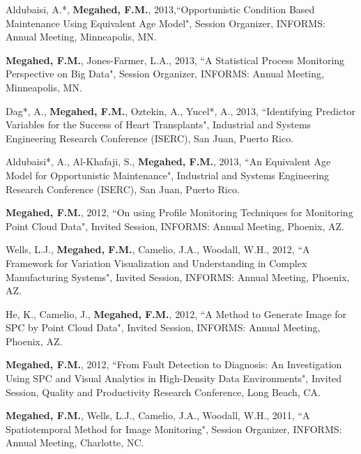 \documentclass[margin,line]{res}
\begin{document}
\begin{resume}
\vspace{-1.5mm}
Aldubaisi, A.*, \textbf{Megahed, F.M.}, 2013,``Opportunistic Condition Based Maintenance Using Equivalent Age Model", Session Organizer, INFORMS: Annual Meeting, Minneapolis, MN.

\vspace{-1.5mm}
\textbf{Megahed, F.M.}, Jones-Farmer, L.A., 2013, ``A Statistical Process Monitoring Perspective on Big Data", Session Organizer, INFORMS: Annual Meeting, Minneapolis, MN.

\vspace{-1.5mm}
Dag*, A., \textbf{Megahed, F.M.}, Oztekin, A., Yucel*, A., 2013, ``Identifying Predictor Variables for the Success of Heart Transplants", Industrial and Systems Engineering Research Conference (ISERC), San Juan, Puerto Rico.

\vspace{-1.5mm}
Aldubaisi*, A., Al-Khafaji, S., \textbf{Megahed, F.M.}, 2013, ``An Equivalent Age Model for Opportunistic Maintenance", Industrial and Systems Engineering Research Conference (ISERC), San Juan, Puerto Rico.

\vspace{-1.5mm}
\textbf{Megahed, F.M.}, 2012, ``On using Profile Monitoring Techniques for Monitoring Point Cloud Data", Invited Session, INFORMS: Annual Meeting, Phoenix, AZ.

\vspace{-1.5mm}
Wells, L.J., \textbf{Megahed, F.M.}, Camelio, J.A., Woodall, W.H., 2012, ``A Framework for Variation Visualization and Understanding in Complex Manufacturing Systems", Invited Session, INFORMS: Annual Meeting, Phoenix, AZ.

\vspace{-1.5mm}
He, K., Camelio, J., \textbf{Megahed, F.M.}, 2012, ``A Method to Generate Image for SPC by Point Cloud Data", Invited Session, INFORMS: Annual Meeting, Phoenix, AZ.

\vspace{-1.5mm}
\textbf{Megahed, F.M.}, 2012, ``From Fault Detection to Diagnosis: An Investigation Using SPC and Visual Analytics in High-Density Data Environments", Invited Session, Quality and Productivity Research Conference, Long Beach, CA.

\vspace{-1.5mm}
\textbf{Megahed, F.M.}, Wells, L.J., Camelio, J.A., Woodall, W.H., 2011, ``A Spatiotemporal Method for Image Monitoring", Session Organizer, INFORMS: Annual Meeting, Charlotte, NC.


\end{resume}
\end{document}
